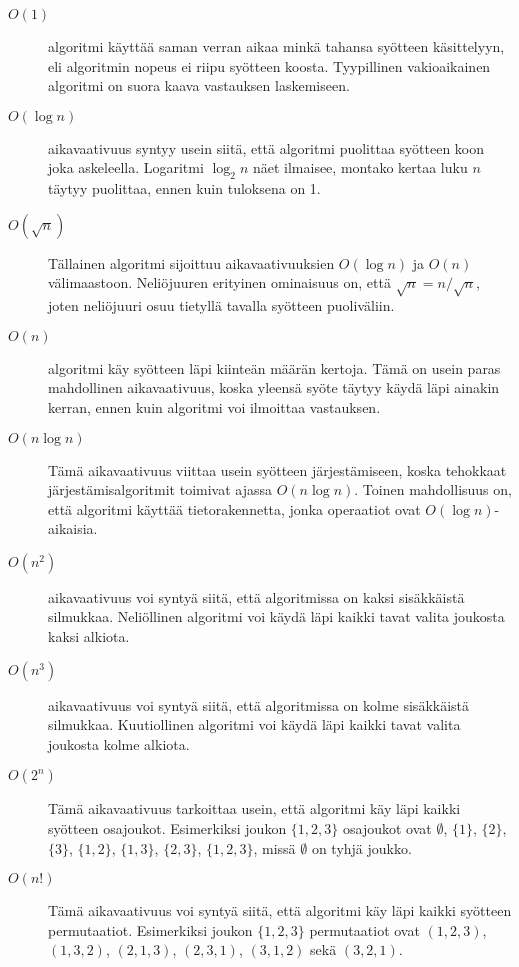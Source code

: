 \begin{description}
\item[$O(1)$]
 algoritmi
käyttää saman verran aikaa minkä tahansa
syötteen käsittelyyn,
eli algoritmin nopeus ei riipu syötteen koosta.
Tyypillinen vakioaikainen algoritmi on suora kaava
vastauksen laskemiseen.

\item[$O(\log n)$]
 aikavaativuus
syntyy usein siitä, että algoritmi
puolittaa syötteen koon joka askeleella.
Logaritmi $\log_2 n$ näet ilmaisee, montako
kertaa luku $n$ täytyy puolittaa,
ennen kuin tuloksena on 1.

\item[$O(\sqrt n)$]

Tällainen algoritmi sijoittuu
aikavaativuuksien $O(\log n)$ ja $O(n)$ välimaastoon.
Neliöjuuren erityinen ominaisuus on,
että $\sqrt n = n/\sqrt n$, joten neliöjuuri
osuu tietyllä tavalla syötteen puoliväliin.

\item[$O(n)$]
 algoritmi käy syötteen läpi
kiinteän määrän kertoja.
Tämä on usein paras mahdollinen aikavaativuus,
koska yleensä syöte täytyy käydä
läpi ainakin kerran,
ennen kuin algoritmi voi ilmoittaa vastauksen.

\item[$O(n \log n)$]

Tämä aikavaativuus viittaa usein
syötteen järjestämiseen,
koska tehokkaat järjestämisalgoritmit toimivat
ajassa $O(n \log n)$.
Toinen mahdollisuus on, että algoritmi
käyttää tietorakennetta,
jonka operaatiot ovat $O(\log n)$-aikaisia.

\item[$O(n^2)$]
 aikavaativuus voi syntyä
siitä, että algoritmissa on 
kaksi sisäkkäistä silmukkaa.
Neliöllinen algoritmi voi käydä läpi kaikki
tavat valita joukosta kaksi alkiota.

\item[$O(n^3)$]
 aikavaativuus voi syntyä siitä,
että algoritmissa on 
kolme sisäkkäistä silmukkaa.
Kuutiollinen algoritmi voi käydä läpi kaikki
tavat valita joukosta kolme alkiota.

\item[$O(2^n)$]

Tämä aikavaativuus tarkoittaa usein,
että algoritmi käy läpi kaikki syötteen osajoukot.
Esimerkiksi joukon $\{1,2,3\}$ osajoukot ovat
$\emptyset$, $\{1\}$, $\{2\}$, $\{3\}$, $\{1,2\}$,
$\{1,3\}$, $\{2,3\}$, $\{1,2,3\}$,
missä $\emptyset$ on tyhjä joukko.

\item[$O(n!)$]

Tämä aikavaativuus voi syntyä siitä,
että algoritmi käy läpi kaikki syötteen permutaatiot.
Esimerkiksi joukon $\{1,2,3\}$ permutaatiot ovat
$(1,2,3)$, $(1,3,2)$, $(2,1,3)$, $(2,3,1)$,
$(3,1,2)$ sekä $(3,2,1)$.

\end{description}

